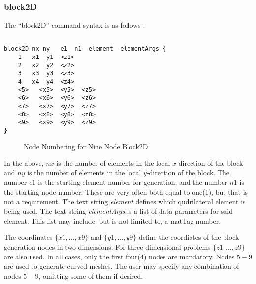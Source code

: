 \documentclass[12pt]{article}
\begin{document}
\subsubsection{block2D}
The ``block2D'' command syntax is as follows :
{\sf\small
\begin{verbatim}

block2D nx ny   e1  n1  element  elementArgs {
    1   x1  y1  <z1>
    2   x2  y2  <z2>
    3   x3  y3  <z3>
    4   x4  y4  <z4>
    <5>   <x5>  <y5>  <z5>
    <6>   <x6>  <y6>  <z6>
    <7>   <x7>  <y7>  <z7>
    <8>   <x8>  <y8>  <z8>
    <9>   <x9>  <y9>  <z9>
}
\end{verbatim}

\begin{figure}[htpb]
\begin{center}
\epsfysize=2.0in
\end{center}
\caption{Node Numbering for Nine Node Block2D}
\label{bricknodenumbering}
\end{figure}
}

In the above, $nx$ is the number of elements in the local $x$-direction of
the block and $ny$ is the number of elements in the local $y$-direction of
the block.  The number $e1$ is the starting element number for generation, and 
the number $n1$ is the starting node number.  These are very often both equal to 
one(1), but that is not a requirement.  The text string {\em element} defines 
which qudrilateral element is being used.  The text string {\em elementArgs}
is a list of data parameters for said element.  This list may include, but is
not limited to, a matTag number.

The coordinates $\{x1,...,x9\}$ and $\{y1,...,y9\}$ define the coordiates
of the block generation nodes in two dimensions.  For three dimensional 
problems $\{z1,...,z9\}$ are also used.  In all cases, only the first four(4) 
nodes are mandatory. Nodes $5-9$ are used to generate curved meshes.
The user may specify any combination of nodes $5-9$, omitting some of them
if desired.
\end{document}
